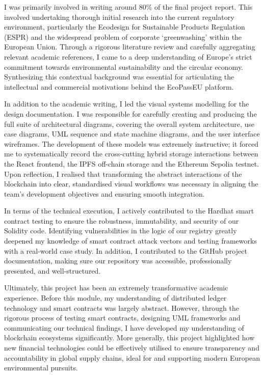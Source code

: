\documentclass[runningheads]{llncs}
\begin{document}
	I was primarily involved in writing around 80\% of the final project report. This involved undertaking thorough initial research into the current regulatory environment, particularly the Ecodesign for Sustainable Products Regulation (ESPR) and the widespread problem of corporate `greenwashing' within the European Union. Through a rigorous literature review and carefully aggregating relevant academic references, I came to a deep understanding of Europe's strict commitment towards environmental sustainability and the circular economy. Synthesizing this contextual background was essential for articulating the intellectual and commercial motivations behind the EcoPassEU platform.
	
	In addition to the academic writing, I led the visual systems modelling for the design documentation. I was responsible for carefully creating and producing the full suite of architectural diagrams, covering the overall system architecture, use case diagrams, UML sequence and state machine diagrams, and the user interface wireframes. The development of these models was extremely instructive; it forced me to systematically record the cross-cutting hybrid storage interactions between the React frontend, the IPFS off-chain storage and the Ethereum Sepolia testnet. Upon reflection, I realised that transforming the abstract interactions of the blockchain into clear, standardised visual workflows was necessary in aligning the team's development objectives and ensuring smooth integration.
	
	In terms of the technical execution, I actively contributed to the Hardhat smart contract testing to ensure the robustness, immutability, and security of our Solidity code. Identifying vulnerabilities in the logic of our registry greatly deepened my knowledge of smart contract attack vectors and testing frameworks with a real-world case study. In addition, I contributed to the GitHub project documentation, making sure our repository was accessible, professionally presented, and well-structured.
	
	Ultimately, this project has been an extremely transformative academic experience. Before this module, my understanding of distributed ledger technology and smart contracts was largely abstract. However, through the rigorous process of testing smart contracts, designing UML frameworks and communicating our technical findings, I have developed my understanding of blockchain ecosystems significantly. More generally, this project highlighted how new financial technologies could be effectively utilised to ensure transparency and accountability in global supply chains, ideal for and supporting modern European environmental pursuits.
	
\end{document}
